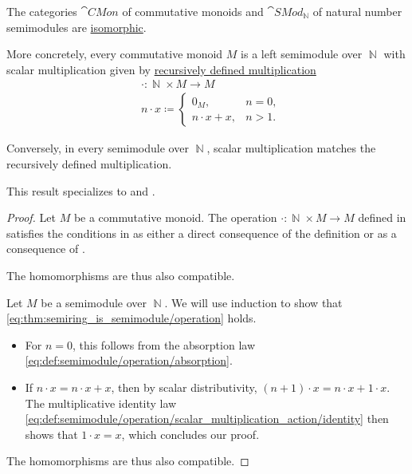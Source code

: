 \begin{proposition}\label{thm:commutative_monoid_is_semimodule}
  The categories \( \hyperref[def:monoid/category]{\cat{CMon}} \) of commutative monoids and \( \hyperref[def:semimodule/category]{\cat{SMod}_\BbbN} \) of natural number semimodules are \hyperref[rem:category_similarity/isomorphism]{isomorphic}.

  More concretely, every commutative monoid \( M \) is a left semimodule over \( \BbbN \) with scalar multiplication given by \hyperref[rem:additive_magma/multiplication]{recursively defined multiplication}
  \begin{equation}\label{eq:thm:commutative_monoid_is_semimodule/operation}
    \begin{aligned}
      &\cdot: \BbbN \times M \to M \\
      &n \cdot x \coloneqq \begin{cases}
        0_M,           &n = 0, \\
        n \cdot x + x, &n > 1.
      \end{cases}
    \end{aligned}
  \end{equation}

  Conversely, in every semimodule over \( \BbbN \), scalar multiplication matches the recursively defined multiplication.

  This result specializes to  and .
\end{proposition}
\begin{proof}
  \SufficiencySubProof Let \( M \) be a commutative monoid. The operation \( \cdot: \BbbN \times M \to M \) defined in  satisfies the conditions in  as either a direct consequence of the definition or as a consequence of .

  The homomorphisms are thus also compatible.

  \NecessitySubProof Let \( M \) be a semimodule over \( \BbbN \). We will use induction to show that \eqref{eq:thm:semiring_is_semimodule/operation} holds.
  \begin{itemize}
    \item For \( n = 0 \), this follows from the absorption law \eqref{eq:def:semimodule/operation/absorption}.
    \item If \( n \cdot x = n \cdot x + x \), then by scalar distributivity, \( (n + 1) \cdot x = n \cdot x + 1 \cdot x \). The multiplicative identity law \eqref{eq:def:semimodule/operation/scalar_multiplication_action/identity} then shows that \( 1 \cdot x = x \), which concludes our proof.
  \end{itemize}

  The homomorphisms are thus also compatible.
\end{proof}

